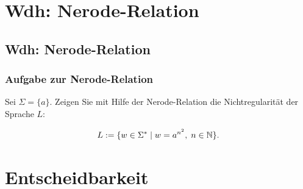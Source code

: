 \newcommand{\thetm}{\begin{tikzpicture}[node distance=2.5cm,auto]
  \node(q0)[state,initial]{$q_0$};
  \node(q1)[state,right of=q0]{$q_1$};
  \node(q2)[state,right of=q1]{$q_2$};
  \node(q3)[state,right of=q2]{$q_3$};
  \node(q4)[state,above of=q3]{$q_4$};
  \node(q5)[state,accepting,below of=q0]{$q_4$};
  \path[->]       (q0) edge node{$a|\sqcup,R$} (q1)
	          (q0) edge node{$\sqcup|\sqcup,N$} (q5)
	          (q1) edge[loop above] node{$a|a,R$} ()
	          (q1) edge node{$b|b,R$} (q2)
	          (q1) edge node{$\sqcup|\sqcup,N$} (q5)
	          (q2) edge[loop below] node{$b|b,R$} ()
	          (q2) edge node{$\sqcup|\sqcup,L$} (q3)
	          (q3) edge node{$b|\sqcup,L$} (q4)
	          (q4) edge[loop above] node{$a|a,L; b|b,L$} ()
	          (q4) edge[bend right] node{$\sqcup|\sqcup,R$} (q0);
 \end{tikzpicture}}



\section{Wdh: Nerode-Relation}
\subsection{Wdh: Nerode-Relation}
\begin{frame}
	\frametitle{Aufgabe zur Nerode-Relation}
	
	Sei $\Sigma = \{a\}$.
Zeigen Sie mit Hilfe der Nerode-Relation die Nichtregularit\"at der Sprache $L$: 

\[L := \{w \in \Sigma^*\mid w = a^{n^2},\; n \in \mathbb{N}\}.\]
\end{frame}

\section{Entscheidbarkeit}
